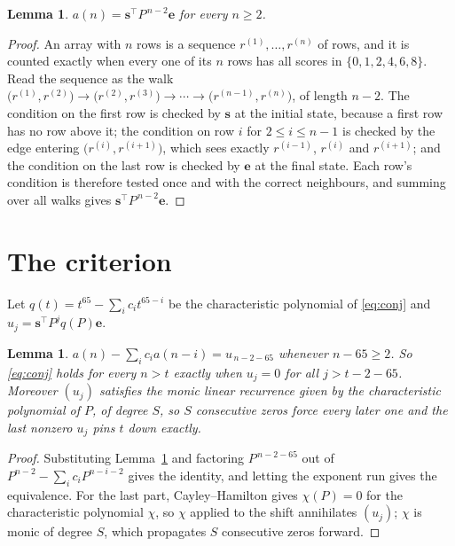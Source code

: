 \documentclass[11pt,a4paper]{article}
\theoremstyle{plain}
\newtheorem{lemma}[theorem]{Lemma}
\theoremstyle{definition}
\begin{document}
\begin{lemma}\label{lem:walk}
$a(n)=\mathbf{s}^{\!\top}P^{\,n-2}\mathbf{e}$ for every $n\ge2$.
\end{lemma}

\begin{proof}
An array with $n$ rows is a sequence $r^{(1)},\dots,r^{(n)}$ of rows, and it is counted
exactly when every one of its $n$ rows has all scores in $\{0,1,2,4,6,8\}$. Read the sequence as the
walk $\bigl(r^{(1)},r^{(2)}\bigr)\to\bigl(r^{(2)},r^{(3)}\bigr)\to\cdots\to
\bigl(r^{(n-1)},r^{(n)}\bigr)$, of length $n-2$. The condition on the first row is
checked by $\mathbf{s}$ at the initial state, because a first row has no row above it; the
condition on row $i$ for $2\le i\le n-1$ is checked by the edge entering
$\bigl(r^{(i)},r^{(i+1)}\bigr)$, which sees exactly $r^{(i-1)}$, $r^{(i)}$ and
$r^{(i+1)}$; and the condition on the last row is checked by $\mathbf{e}$ at the final
state. Each row's condition is therefore tested once and with the correct neighbours, and
summing over all walks gives $\mathbf{s}^{\!\top}P^{\,n-2}\mathbf{e}$.
\end{proof}

\section{The criterion}

Let $q(t)=t^{65}-\sum_i c_i t^{65-i}$ be the characteristic polynomial of
\eqref{eq:conj} and $u_j=\mathbf{s}^{\!\top}P^{j}q(P)\mathbf{e}$.

\begin{lemma}\label{lem:crit}
$a(n)-\sum_i c_i a(n-i)=u_{\,n-2-65}$ whenever $n-65\ge2$. So \eqref{eq:conj}
holds for every $n>t$ exactly when $u_j=0$ for all $j>t-2-65$. Moreover $(u_j)$
satisfies the monic linear recurrence given by the characteristic polynomial of $P$, of
degree $S$, so $S$ consecutive zeros force every later one and the last nonzero $u_j$ pins
$t$ down exactly.
\end{lemma}

\begin{proof}
Substituting Lemma~\ref{lem:walk} and factoring $P^{\,n-2-65}$ out of
$P^{n-2}-\sum_i c_i P^{n-i-2}$ gives the identity, and letting the exponent run gives the
equivalence. For the last part, Cayley--Hamilton gives $\chi(P)=0$ for the characteristic
polynomial $\chi$, so $\chi$ applied to the shift annihilates $(u_j)$; $\chi$ is monic of
degree $S$, which propagates $S$ consecutive zeros forward.
\end{proof}
\end{document}
